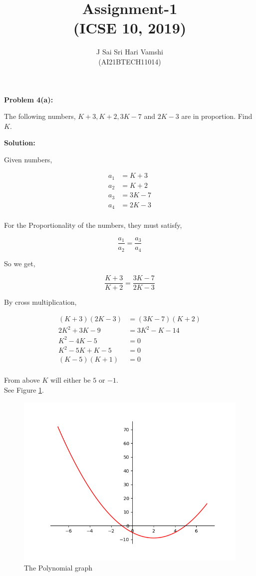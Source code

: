 \documentclass[journal,12pt,twocolumn]{article}\usepackage[margin=1.25 in]{geometry}
\title{\LARGE{\textbf{Assignment-1}\\(ICSE 10, 2019)}}
\author{J Sai Sri Hari Vamshi\\ (AI21BTECH11014)}
\date{}
\begin{document}
\maketitle

\begin{center}
    \textbf{\large Problem 4(a):}
\end{center}
\begin{flushleft}
The following numbers, $K + 3, K + 2, 3K - 7$ and $2K - 3$ are in proportion. Find $K$.\\[2\baselineskip]
\end{flushleft}
\begin{center}
    \textbf{\large Solution:}
\end{center}

\noindent Given numbers,

\begin{align*}
a_1 & = K + 3\\
a_2 & = K + 2\\
a_3 & = 3K - 7\\
a_4 & = 2K - 3\\
\end{align*}

\noindent For the Proportionality of the numbers, they must satisfy,

\[ \frac{a_1}{a_2} = \frac{a_3}{a_4} \]

\noindent So we get,

\[ \frac{K + 3}{K + 2} = \frac{3K - 7}{2K - 3} \]

\noindent By cross multiplication,

\begin{align*}
    (K + 3)(2K - 3) & = (3K - 7)(K + 2)\\
    2K^2 + 3K - 9 & = 3K^2 - K - 14\\
    K^2 - 4K - 5 & = 0\\
    K^2 - 5K + K - 5 & = 0\\
    (K - 5)(K + 1) & = 0\\
\end{align*}

\noindent From above $K$ will either be $5$ or $-1$.\\

\noindent See Figure
	  \ref{Figure_1_py.png}.
  \begin{figure}
	  \centering 
	  \includegraphics[width=\columnwidth]{Figure_1_py.png}
	  \caption{The Polynomial graph}
	  \label{Figure_1_py.png}
	  \end{figure}
\end{document}
